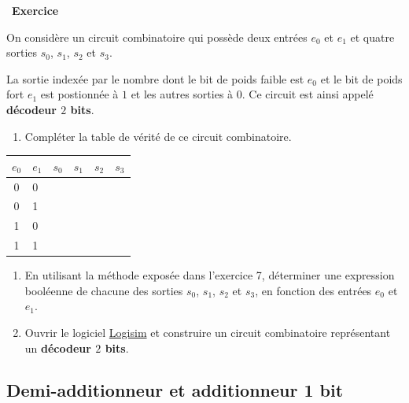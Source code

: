 \documentclass[
  11pt,
]{article}
\providecommand{\tightlist}{%
  \setlength{\itemsep}{0pt}\setlength{\parskip}{0pt}}
\newcounter{exo}
\newenvironment{exercice}[1]
{\par \medskip   \addtocounter{exo}{1} \noindent  
\begin{bclogo}[arrondi =0.1,   noborder = true, logo=\bccrayon, marge=4]{~\textbf{Exercice} \textbf{\theexo} {\itshape #1} }  \par}
{
\end{bclogo}
 \par \bigskip }
\newcounter{def}
\newcounter{logi}
\begin{document}
\begin{exercice}{}

On considère un circuit combinatoire qui possède deux entrées \(e_{0}\)
et \(e_{1}\) et quatre sorties \(s_{0}\), \(s_{1}\), \(s_{2}\) et
\(s_{3}\).

La sortie indexée par le nombre dont le bit de poids faible est
\(e_{0}\) et le bit de poids fort \(e_{1}\) est postionnée à \(1\) et
les autres sorties à \(0\). Ce circuit est ainsi appelé \textbf{décodeur
\(2\) bits}.

\begin{enumerate}
\def\labelenumi{\arabic{enumi}.}
\tightlist
\item
  Compléter la table de vérité de ce circuit combinatoire.
\end{enumerate}

\begin{longtable}[]{@{}clllll@{}}
\toprule
\(e_{0}\) & \(e_{1}\) & \(s_{0}\) & \(s_{1}\) & \(s_{2}\) &
\(s_{3}\)\tabularnewline
\midrule
\endhead
0 & 0 & & & &\tabularnewline
0 & 1 & & & &\tabularnewline
1 & 0 & & & &\tabularnewline
1 & 1 & & & &\tabularnewline
\bottomrule
\end{longtable}

\begin{enumerate}
\def\labelenumi{\arabic{enumi}.}
\setcounter{enumi}{1}
\item
  En utilisant la méthode exposée dans l'exercice 7, déterminer une
  expression booléenne de chacune des sorties \(s_{0}\), \(s_{1}\),
  \(s_{2}\) et \(s_{3}\), en fonction des entrées \(e_{0}\) et
  \(e_{1}\).
\item
  Ouvrir le logiciel \href{http://www.cburch.com/logisim/}{Logisim} et
  construire un circuit combinatoire représentant un \textbf{décodeur
  \(2\) bits}.
\end{enumerate}

\end{exercice}

\hypertarget{demi-additionneur-et-additionneur-1-bit}{%
\subsection{Demi-additionneur et additionneur 1
bit}\label{demi-additionneur-et-additionneur-1-bit}}
\end{document}

